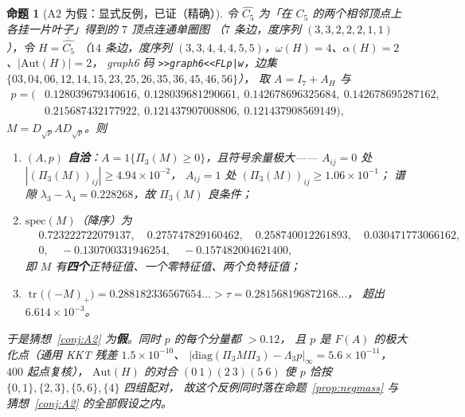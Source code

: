 \documentclass[UTF8,11pt]{ctexart}
\newtheorem{proposition}[theorem]{命题}
\theoremstyle{definition}
\newcommand{\Lam}{\Lambda}
\newcommand{\tr}{\operatorname{tr}}
\begin{document}
\begin{proposition}[A2 为假：显式反例，已证（精确）]\label{prop:A2no}
令 $\widehat{C_5}$ 为「在 $C_5$ 的两个\emph{相邻}顶点上各挂一片叶子」得到的 $7$ 顶点连通单圈图
（$7$ 条边，度序列 $(3,3,2,2,2,1,1)$），令 $H=\overline{\widehat{C_5}}$
（$14$ 条边，度序列 $(3,3,4,4,4,5,5)$，$\omega(H)=4$、$\alpha(H)=2$、$|\mathrm{Aut}(H)|=2$，
graph6 码 \texttt{>>graph6<<FLp|w}，边集
$\{03,04,06,12,14,15,23,25,26,35,36,45,46,56\}$），
取 $A=I_7+A_H$ 与
\[
\begin{aligned}
p=\bigl(&0.128039679340616,\ 0.128039681290661,\ 0.142678696325684,\ 0.142678695287162,\\
&0.215687432177922,\ 0.121437907008806,\ 0.121437908569149\bigr),
\end{aligned}
\]
$M=D_{\sqrt p}AD_{\sqrt p}$。则
\begin{enumerate}[label=(\alph*),leftmargin=2em,itemsep=1pt]
\item $(A,p)$ \textbf{自洽}：$A=1\{\Pi_3(M)\ge0\}$，且符号余量极大——
      $A_{ij}=0$ 处 $|(\Pi_3(M))_{ij}|\ge4.94\times10^{-2}$，
      $A_{ij}=1$ 处 $(\Pi_3(M))_{ij}\ge1.06\times10^{-1}$；
      谱隙 $\lambda_3-\lambda_4=0.228268$，故 $\Pi_3(M)$ 良条件；
\item $\mathrm{spec}(M)$（降序）为
      \[
      \begin{aligned}
      &0.723222722079137,\quad 0.275747829160462,\quad 0.258740012261893,\quad 0.030471773066162,\\
      &0,\quad -0.130700331946254,\quad -0.157482004621400,
      \end{aligned}
      \]
      即 $M$ 有\textbf{四个}正特征值、一个零特征值、两个负特征值；
\item $\tr\bigl((-M)_+\bigr)=0.288182336567654\ldots>\tau=0.281568196872168\ldots$，
      超出 $6.614\times10^{-3}$。
\end{enumerate}
于是猜想~\ref{conj:A2} 为\textbf{假}。同时 $p$ 的每个分量都 $>0.12$，
且 $p$ 是 $F(A)$ 的极大化点（通用 KKT 残差 $1.5\times10^{-10}$、
$|\mathrm{diag}(\Pi_3M\Pi_3)-\Lam_3p|_\infty=5.6\times10^{-11}$，$400$ 起点复核），
$\mathrm{Aut}(H)$ 的对合 $(0\ 1)(2\ 3)(5\ 6)$ 使 $p$ 恰按 $\{0,1\},\{2,3\},\{5,6\},\{4\}$ 四组配对，
故这个反例同时落在命题~\ref{prop:negmass} 与猜想~\ref{conj:A2} 的\emph{全部}假设之内。
\end{proposition}
\end{document}
